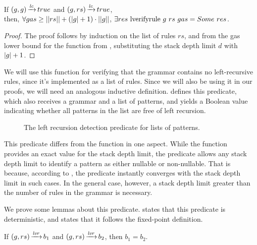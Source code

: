 \begin{lemma}%
    If $(g,g) \operatorname{\xrightarrow{\mathit{lc}}} true$ and $(g,rs) \operatorname{\xrightarrow{\mathit{lc}}} true$, \\
    then, $\forall gas \ge ||rs|| + (|g| + 1) \cdot ||g||$,
    $\exists res\ \lverifyrulecomp{g}{rs}{gas} = \Some res$.
\end{lemma}

\begin{proof}
    The proof follows by induction on the list of rules $rs$,
    and from the gas lower bound for the function \textit{\verifyrulename{}}
    from ,
    substituting the stack depth limit $d$ with $|g|+1$.
\end{proof}

We will use this function for
verifying that the grammar contains
no left-recursive rules,
since it's implemented as a list of rules.
Since we will also be using it in our proofs,
we will need an analogous inductive definition.
 defines this predicate,
which also receives a grammar and a list of patterns,
and yields a Boolean value indicating
whether all patterns in the list are free of left recursion.

\begin{figure}
    \centering
    
    \caption{The left recursion detection predicate for lists of patterns.}
    \label{fig:lverifyrule}
\end{figure}

This predicate differs from the function in one aspect.
While the function provides an exact value for the
stack depth limit, the predicate allows any stack depth limit
to identify a pattern as either nullable or non-nullable.
That is because, according to ,
the predicate instantly converges with the stack depth limit in such cases.
In the general case, however,
a stack depth limit greater than
the number of rules in the grammar
is necessary.

We prove some lemmas about this predicate.
states that this predicate is deterministic,
and 
states that it follows the fixed-point definition.

\begin{lemma}
    If $(g,rs) \operatorname{\xrightarrow{\mathit{lvr}}} b_1$
    and $(g,rs) \operatorname{\xrightarrow{\mathit{lvr}}} b_2$,
    then $b_1 = b_2$.
    \label{lemma:lverifyrule-determinism}
\end{lemma}

